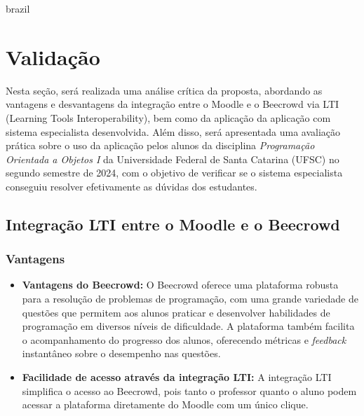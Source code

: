 

\begin{otherlanguage*}{brazil}

\chapter{Validação}

Nesta seção, será realizada uma análise crítica da proposta, abordando as vantagens e desvantagens da integração entre o Moodle e o Beecrowd via LTI (Learning Tools Interoperability), bem como da aplicação da aplicação com sistema especialista desenvolvida. Além disso, será apresentada uma avaliação prática sobre o uso da aplicação pelos alunos da disciplina \textit{Programação Orientada a Objetos I} da Universidade Federal de Santa Catarina (UFSC) no segundo semestre de 2024, com o objetivo de verificar se o sistema especialista conseguiu resolver efetivamente as dúvidas dos estudantes.

\section{Integração LTI entre o Moodle e o Beecrowd}

\subsection{Vantagens}
\begin{itemize}
    \item \textbf{Vantagens do Beecrowd:} O Beecrowd oferece uma plataforma robusta para a resolução de problemas de programação, com uma grande variedade de questões que permitem aos alunos praticar e desenvolver habilidades de programação em diversos níveis de dificuldade. A plataforma também facilita o acompanhamento do progresso dos alunos, oferecendo métricas e \textit{feedback} instantâneo sobre o desempenho nas questões.
    \item \textbf{Facilidade de acesso através da integração LTI:} A integração LTI simplifica o acesso ao Beecrowd, pois tanto o professor quanto o aluno podem acessar a plataforma diretamente do Moodle com um único clique.
\end{itemize}


\end{otherlanguage*}
